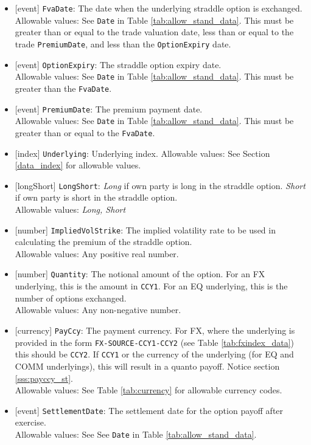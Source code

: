 \begin{itemize}
  \item{}[event] \lstinline!FvaDate!: The date when the underlying straddle option is exchanged. \\
    Allowable values: See \lstinline!Date! in Table \ref{tab:allow_stand_data}.
    This must be greater than or equal to the trade valuation date, less than or equal
    to the trade \lstinline!PremiumDate!, and less than the \lstinline!OptionExpiry!
    date.
  \item{}[event] \lstinline!OptionExpiry!: The straddle option expiry date. \\
    Allowable values: See \lstinline!Date! in Table \ref{tab:allow_stand_data}.
    This must be greater than the \lstinline!FvaDate!.
  \item{}[event] \lstinline!PremiumDate!: The premium payment date. \\
    Allowable values: See \lstinline!Date! in Table \ref{tab:allow_stand_data}.
    This must be greater than or equal to the \lstinline!FvaDate!.
  \item{}[index] \lstinline!Underlying!: Underlying index.
    Allowable values: See Section \ref{data_index} for allowable values.
  \item{}[longShort] \lstinline!LongShort!: \emph{Long} if own party is long in the straddle option. \emph{Short} if own party is short in the straddle option.\\
    Allowable values: \emph{Long, Short}
  \item{}[number] \lstinline!ImpliedVolStrike!: The implied volatility rate to be used in calculating the premium of the straddle option.\\
    Allowable values: Any positive real number.
  \item{}[number] \lstinline!Quantity!: The notional amount of the option. For an FX underlying, this is the amount in \lstinline!CCY1!.
  For an EQ underlying, this is the number of options exchanged.\\
    Allowable values: Any non-negative number.
  \item{}[currency] \lstinline!PayCcy!: The payment currency. For FX, where the underlying is provided
      in the form \lstinline!FX-SOURCE-CCY1-CCY2! (see Table \ref{tab:fxindex_data}) this should
      be \lstinline!CCY2!. If \lstinline!CCY1! or the currency of the underlying (for EQ and
      COMM underlyings), this will result in a quanto payoff. Notice section \ref{sss:payccy_st}. \\
        Allowable values: See Table \ref{tab:currency} for allowable currency codes.
  \item{}[event] \lstinline!SettlementDate!: The settlement date for the option payoff after exercise.\\
    Allowable values: See See \lstinline!Date! in Table \ref{tab:allow_stand_data}.
\end{itemize}

